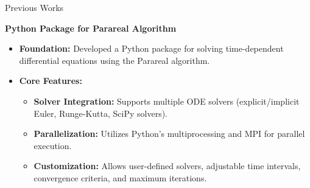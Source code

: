 \documentclass[aspectratio=169,xcolor=dvipsnames, t]{beamer}
\begin{document}

\begin{frame}{Previous Works}
    \begin{block}{\textbf{Python Package for Parareal Algorithm}}
        \begin{itemize}
            \item \textbf{Foundation:} Developed a Python package for solving time-dependent differential equations using the Parareal algorithm.
            \item \textbf{Core Features:}
                \begin{itemize}
                    \item \textbf{Solver Integration:} Supports multiple ODE solvers (explicit/implicit Euler, Runge-Kutta, SciPy solvers).
                    \item \textbf{Parallelization:} Utilizes Python's multiprocessing and MPI for parallel execution.
                    \item \textbf{Customization:} Allows user-defined solvers, adjustable time intervals, convergence criteria, and maximum iterations.
                \end{itemize}
        \end{itemize}
    \end{block}
\end{frame}
\end{document}
